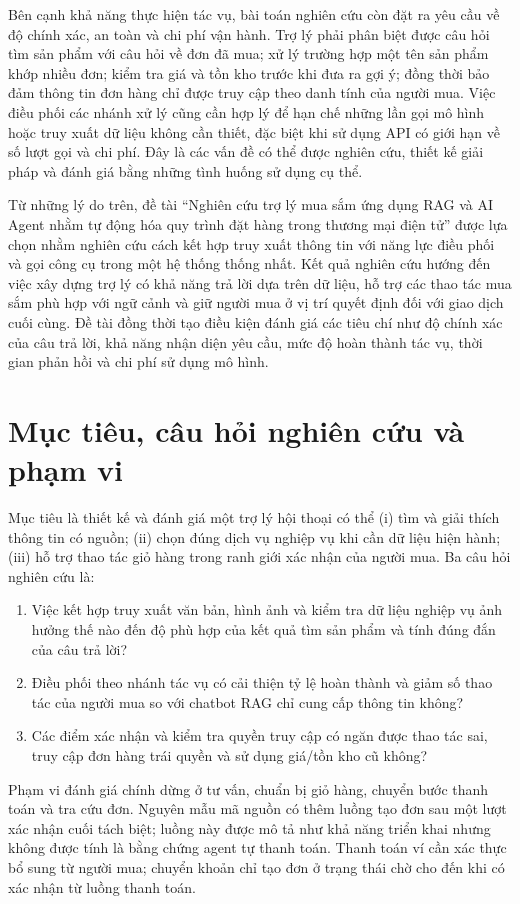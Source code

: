 \documentclass[12pt,a4paper,oneside]{report}
\begin{document}
Bên cạnh khả năng thực hiện tác vụ, bài toán nghiên cứu còn đặt ra yêu cầu về độ chính xác, an toàn và chi phí vận hành. Trợ lý phải phân biệt được câu hỏi tìm sản phẩm với câu hỏi về đơn đã mua; xử lý trường hợp một tên sản phẩm khớp nhiều đơn; kiểm tra giá và tồn kho trước khi đưa ra gợi ý; đồng thời bảo đảm thông tin đơn hàng chỉ được truy cập theo danh tính của người mua. Việc điều phối các nhánh xử lý cũng cần hợp lý để hạn chế những lần gọi mô hình hoặc truy xuất dữ liệu không cần thiết, đặc biệt khi sử dụng API có giới hạn về số lượt gọi và chi phí. Đây là các vấn đề có thể được nghiên cứu, thiết kế giải pháp và đánh giá bằng những tình huống sử dụng cụ thể.

Từ những lý do trên, đề tài “Nghiên cứu trợ lý mua sắm ứng dụng RAG và AI Agent nhằm tự động hóa quy trình đặt hàng trong thương mại điện tử” được lựa chọn nhằm nghiên cứu cách kết hợp truy xuất thông tin với năng lực điều phối và gọi công cụ trong một hệ thống thống nhất. Kết quả nghiên cứu hướng đến việc xây dựng trợ lý có khả năng trả lời dựa trên dữ liệu, hỗ trợ các thao tác mua sắm phù hợp với ngữ cảnh và giữ người mua ở vị trí quyết định đối với giao dịch cuối cùng. Đề tài đồng thời tạo điều kiện đánh giá các tiêu chí như độ chính xác của câu trả lời, khả năng nhận diện yêu cầu, mức độ hoàn thành tác vụ, thời gian phản hồi và chi phí sử dụng mô hình.

\section{Mục tiêu, câu hỏi nghiên cứu và phạm vi}
Mục tiêu là thiết kế và đánh giá một trợ lý hội thoại có thể (i) tìm và giải thích thông tin có nguồn; (ii) chọn đúng dịch vụ nghiệp vụ khi cần dữ liệu hiện hành; (iii) hỗ trợ thao tác giỏ hàng trong ranh giới xác nhận của người mua. Ba câu hỏi nghiên cứu là:
\begin{enumerate}[label=RQ\arabic*.]
\item Việc kết hợp truy xuất văn bản, hình ảnh và kiểm tra dữ liệu nghiệp vụ ảnh hưởng thế nào đến độ phù hợp của kết quả tìm sản phẩm và tính đúng đắn của câu trả lời?
\item Điều phối theo nhánh tác vụ có cải thiện tỷ lệ hoàn thành và giảm số thao tác của người mua so với chatbot RAG chỉ cung cấp thông tin không?
\item Các điểm xác nhận và kiểm tra quyền truy cập có ngăn được thao tác sai, truy cập đơn hàng trái quyền và sử dụng giá/tồn kho cũ không?
\end{enumerate}
Phạm vi đánh giá chính dừng ở tư vấn, chuẩn bị giỏ hàng, chuyển bước thanh toán và tra cứu đơn. Nguyên mẫu mã nguồn có thêm luồng tạo đơn sau một lượt xác nhận cuối tách biệt; luồng này được mô tả như khả năng triển khai nhưng không được tính là bằng chứng agent tự thanh toán. Thanh toán ví cần xác thực bổ sung từ người mua; chuyển khoản chỉ tạo đơn ở trạng thái chờ cho đến khi có xác nhận từ luồng thanh toán.
\end{document}
